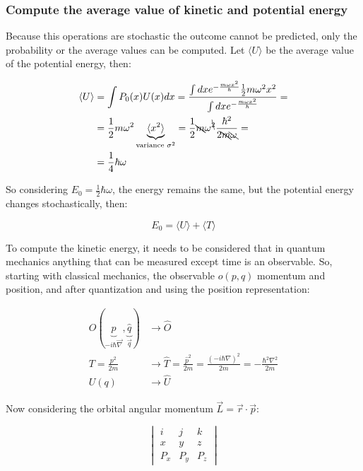     \subsubsection{Compute the average value of kinetic and potential energy}
    Because this operations are stochastic the outcome cannot be predicted, only the probability or the average values can be computed.
    Let $\langle U\rangle $ be the average value of the potential energy, then:

    \begin{align*}
      \langle U\rangle  &= \int P_0(x)U(x)dx = \frac{\int dx e^{-\frac{m\omega x^2}{\hbar}}\frac{1}{2}m\omega^2x^2}{\int dx e^{-\frac{m\omega x^2}{\hbar}}} =\\
          &= \frac{1}{2}m\omega^2\underbrace{\langle x^2\rangle }_{\text{variance }\sigma^2} = \frac{1}{2}\bcancel{m}\omega^{\bcancel{2}}\frac{\hbar^2}{2\bcancel{m}\bcancel{\omega}}=\\
          &=\frac{1}{4}\hbar\omega
    \end{align*}

    So considering $E_0 = \frac{1}{2}\hbar\omega$, the energy remains the same, but the potential energy changes stochastically, then:

    $$E_0 = \langle U\rangle  + \langle T\rangle $$

    To compute the kinetic energy, it needs to be considered that in quantum mechanics anything that can be measured except time is an observable.
    So, starting with classical mechanics, the observable $o(p,q)$ momentum and position, and after quantization and using the position representation:

    \begin{align*}
      O(\underbrace{\hat{p}}_{-i\hbar\vec{\nabla}},\underbrace{\hat{q}}_{\vec{q}}) &\rightarrow \hat{O}\\
      T = \frac{p^2}{2m}&\rightarrow \hat{T} = \frac{\hat{p}^2}{2m} = \frac{(-i\hbar\nabla)^2}{2m} = -\frac{\hbar^2\nabla^2}{2m}\\
      U(q)&\rightarrow \hat{U}
    \end{align*}

    Now considering the orbital angular momentum $\vec{L} =\vec{r}\cdot\vec{p}$:

    $$\begin{vmatrix}i&j&k\\x&y&z\\P_x&P_y&P_z\end{vmatrix}$$


